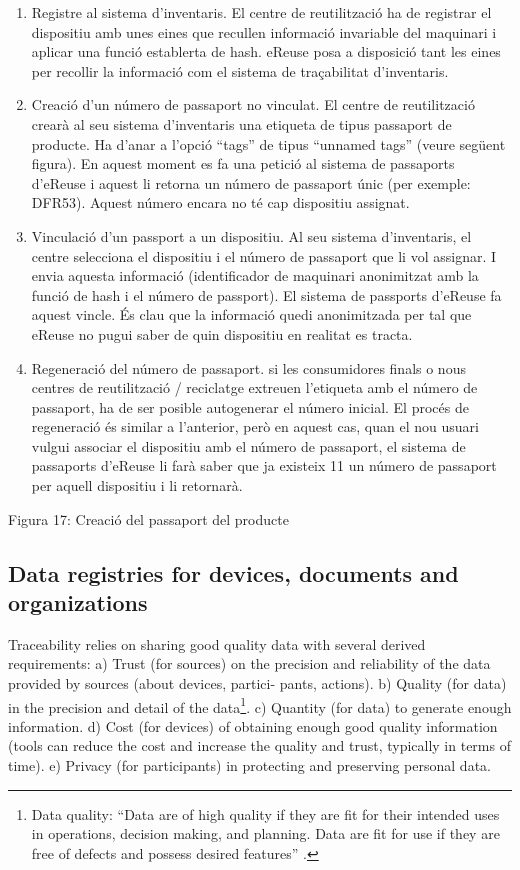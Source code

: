 \documentclass[
]{book}
\begin{document}
\begin{enumerate}
\def\labelenumi{\arabic{enumi}.}
\item
  Registre al sistema d'inventaris. El centre de reutilització ha de registrar el dispositiu amb unes eines que recullen informació invariable del maquinari i aplicar una funció establerta de hash. eReuse posa a disposició tant les eines per recollir la informació com el sistema de traçabilitat d'inventaris.
\item
  Creació d'un número de passaport no vinculat. El centre de reutilització crearà al seu sistema d'inventaris una etiqueta de tipus passaport de producte. Ha d'anar a l'opció ``tags'' de tipus ``unnamed tags'' (veure següent figura). En aquest moment es fa una petició al sistema de passaports d'eReuse i aquest li retorna un número de passaport únic (per exemple: DFR53). Aquest número encara no té cap dispositiu assignat.
\item
  Vinculació d'un passport a un dispositiu. Al seu sistema d'inventaris, el centre selecciona el dispositiu i el número de passaport que li vol assignar. I envia aquesta informació (identificador de maquinari anonimitzat amb la funció de hash i el número de passport). El sistema de passports d'eReuse fa aquest vincle. És clau que la informació quedi anonimitzada per tal que eReuse no pugui saber de quin dispositiu en realitat es tracta.
\item
  Regeneració del número de passaport. si les consumidores finals o nous centres de reutilització / reciclatge extreuen l'etiqueta amb el número de passaport, ha de ser posible autogenerar el número inicial. El procés de regeneració és similar a l'anterior, però en aquest cas, quan el nou usuari vulgui associar el dispositiu amb el número de passaport, el sistema de passaports d'eReuse li farà saber que ja existeix 11 un número de passaport per aquell dispositiu i li retornarà.
\end{enumerate}

Figura 17: Creació del passaport del producte

\hypertarget{data-registries-for-devices-documents-and-organizations}{%
\subsection{Data registries for devices, documents and organizations}\label{data-registries-for-devices-documents-and-organizations}}

Traceability relies on sharing good quality data with several derived requirements: a) Trust (for sources) on the precision and reliability of the data provided by sources (about devices, partici- pants, actions). b) Quality (for data) in the precision and detail of the data\footnote{Data quality: ``Data are of high quality if they are fit for their intended uses in operations, decision making, and planning. Data are fit for use if they are free of defects and possess desired features'' \citep{redman2001data}.}. c) Quantity (for data) to generate enough information. d) Cost (for devices) of obtaining enough good quality information (tools can reduce the cost and increase the quality and trust, typically in terms of time). e) Privacy (for participants) in protecting and preserving personal data.
\end{document}
